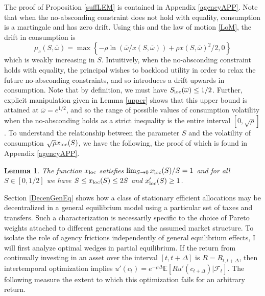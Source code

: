 \documentclass[11pt]{article}
\theoremstyle{plain}
\newtheorem{lemma}[thm]{Lemma}
\theoremstyle{definition} %
\begin{document}
The proof of Proposition \ref{suffLEM} is contained in Appendix \ref{agencyAPP}. Note that when the no-absconding constraint does not hold with equality, consumption is a martingale and has zero drift. Using this and the law of motion \eqref{LoM}, the drift in consumption is 
\begin{equation}
\mu_c(S,\overline{\omega}) = \max\left\{-\rho \ln (\overline{\omega}/x(S,\overline{\omega})) + \rho x(S,\overline{\omega})^2/2, 0\right\}
\label{generalmuc}
\end{equation} %
which is weakly increasing in $S$. Intuitively, when the no-absconding constraint holds with equality, the principal wishes to backload utility in order to relax the future no-absconding constraints, and so introduces a drift upwards in consumption. Note that by definition, we must have $S_{\textnormal{loc}}(\overline{\omega}) \leq 1/2$. Further, explicit manipulation given in Lemma \ref{upper} shows that this upper bound is attained at $\overline{\omega} = e^{1/2}$, and so the range of possible values of consumption volatility when the no-absconding holds as a strict inequality is the entire interval $[0, \sqrt{\rho}]$. To understand the relationship between the parameter $S$ and the volatility of consumption $\sqrt{\rho} x_{\textnormal{loc}}(S)$, we have the following, the proof of which is found in Appendix \ref{agencyAPP}. 

\begin{lemma}\label{Rfact}
The function $x_{\textnormal{loc}}$ satisfies $\lim_{S \rightarrow 0} x_{\textnormal{loc}}(S)/S = 1$ and for all $S \in [0,1/2]$ we have $S \leq x_{\textnormal{loc}}(S) \leq 2S$ and $x_{\textnormal{loc}}'(S) \geq 1$. 
\end{lemma}

Section \ref{DecenGenEq} shows how a class of stationary efficient allocations may be decentralized in a general equilibrium model using a particular set of taxes and transfers. Such a characterization is necessarily specific to the choice of Pareto weights attached to different generations and the assumed market structure. To isolate the role of agency frictions independently of general equilibrium effects, I will first analyze optimal wedges in partial equilibrium. If the return from continually investing in an asset over the interval $[t, t + \Delta]$ is $R = R_{t,t+\Delta}$, then intertemporal optimization implies $u'(c_t) = e^{-\rho \Delta} \mathbb{E}[Ru'(c_{t + \Delta}) | \mathcal{F}_t]$. The following measure the extent to which this optimization fails for an arbitrary return.
\end{document}
